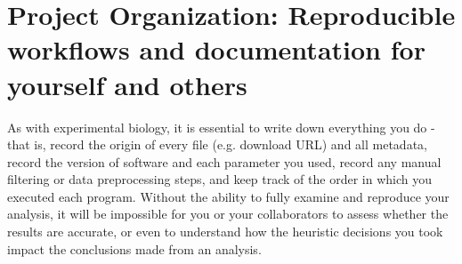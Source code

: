 \documentclass[10pt,letterpaper]{article}
\begin{document}





\section*{Project Organization: Reproducible workflows and documentation for yourself and others}
As with experimental biology, it is essential to write down everything you do - that is, record the origin of every file (e.g. download URL) and all metadata, record the version of software and each parameter you used, record any manual filtering or data preprocessing steps, and keep track of the order in which you executed each program. Without the ability to fully examine and reproduce your analysis, it will be impossible for you or your collaborators to assess whether the results are accurate, or even to understand how the heuristic decisions you took impact the conclusions made from an analysis. 
\end{document}
